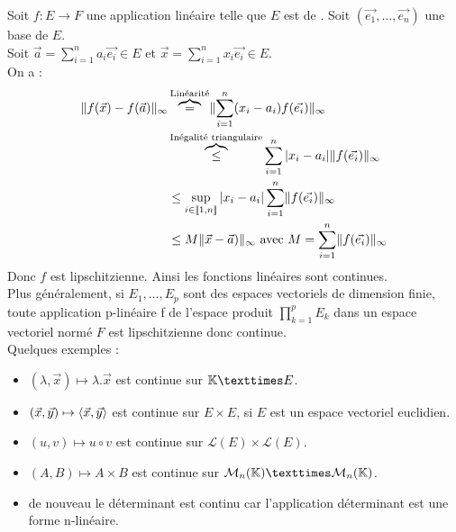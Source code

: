 \documentclass{book}
\begin{document}
\begin{Exemple}
Soit $f:E \to F$ une application linéaire telle que $E$ est de . Soit $(\vec{e_1},\dots,\vec{e_n})$ une base  de $E$.\\
Soit $\vec{a}=\sum_{i=1}^n a_i \vec{e_i}\in E$ et $\vec{x}=\sum_{i=1}^n x_i \vec{e_i}\in E$.\\
On a :
$$\begin{aligned}
\mathopen\lVert f(\vec{x})-f(\vec{a}) \mathclose\rVert_\infty&\overbrace{=}^{\text{Linéarité}}\mathopen\lVert  \sum_{i=1}^n (x_i-a_i)f(\vec{e_i}) \mathclose\rVert_{\infty}\\
&\overbrace{\leq }^{\text{Inégalité triangulaire}}\sum_{i=1}^n |x_i-a_i| \mathopen\lVert  f(\vec{e_i}) \mathclose\rVert_{\infty}\\
&\leq \sup_{i\in\mathopen\lbrack\!\lbrack1,n \mathclose\rbrack\!\rbrack } |x_i-a_i| \sum_{i=1}^n \mathopen\lVert  f(\vec{e_i}) \mathclose\rVert_{\infty}\\
&\leq M \mathopen\lVert  \vec{x}-\vec{a}) \mathclose\rVert_{\infty}\text{ avec }M=\sum_{i=1}^n \mathopen\lVert  f(\vec{e_i}) \mathclose\rVert_{\infty}\\
\end{aligned}$$ 
Donc $f$ est lipschitzienne. Ainsi les fonctions linéaires sont continues.\\
Plus généralement, si $E_1,\dots, E_p$ sont des espaces vectoriels de dimension finie, toute
application p-linéaire f de l'espace produit $\prod_{k=1}^p E_k$ dans un espace vectoriel normé $F$ est lipschitzienne donc continue.\\
Quelques exemples :
\begin{itemize}
\item $(\lambda, \vec{x})\mapsto \lambda.\vec{x}$ est continue sur $\K × E$.
\item $(\vec{x}, \vec{y}) \mapsto \langle\vec{x},\vec{y}\rangle$ est continue sur $E × E$, si $E$ est un espace vectoriel euclidien.
\item $(u, v) \mapsto u \circ v$ est continue sur $\mathcal{L}(E) × \mathcal{L}(E)$. 
\item $(A, B)\mapsto A × B$ est continue sur $\MnK × \MnK$.
\item de nouveau le déterminant est continu car l'application déterminant est une forme n-linéaire.
\end{itemize}
\end{Exemple}
\end{document}
